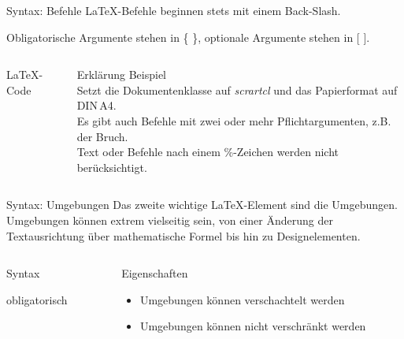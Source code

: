 \begin{frame}[fragile]{Syntax: Befehle}
  \LaTeX-Befehle beginnen stets mit einem Back-Slash.

  Obligatorische Argumente stehen in \{ \}, optionale Argumente stehen in [ ].
  \begin{columns}[T]
    \begin{column}{0.53\textwidth}
      \begin{block}{\LaTeX-Code}
      \end{block}
    \end{column}
    \begin{column}{0.41\textwidth}
      \begin{block}{Erklärung}
        Beispiel \\
        Setzt die Dokumentenklasse auf \emph{scrartcl} und das Papierformat auf DIN\,A4. \\
        Es gibt auch Befehle mit zwei oder mehr Pflichtargumenten, z.B. der Bruch. \\
        Text oder Befehle nach einem \%-Zeichen werden nicht berücksichtigt.
      \end{block}
    \end{column}
  \end{columns}
\end{frame}

\begin{frame}[fragile]{Syntax: Umgebungen}
  Das zweite wichtige \LaTeX-Element sind die Umgebungen.
  Umgebungen können extrem vielseitig sein, von einer Änderung der Textausrichtung über mathematische Formel bis hin zu Designelementen.
  \begin{columns}[T]
    \begin{column}{0.47\textwidth}
      \begin{block}{Syntax}
        \begin{lstverbatim}
        \begin{Umgebung}[optional]
            {obligatorisch}
        \end{Umgebung}
        \end{lstverbatim}
      \end{block}
    \end{column}
    \begin{column}{0.47\textwidth}
      \begin{block}{Eigenschaften}
        \begin{itemize}
          \item Umgebungen können verschachtelt werden
          \item Umgebungen können \alert{nicht} verschränkt werden
        \end{itemize}
      \end{block}
    \end{column}
  \end{columns}
\end{frame}


